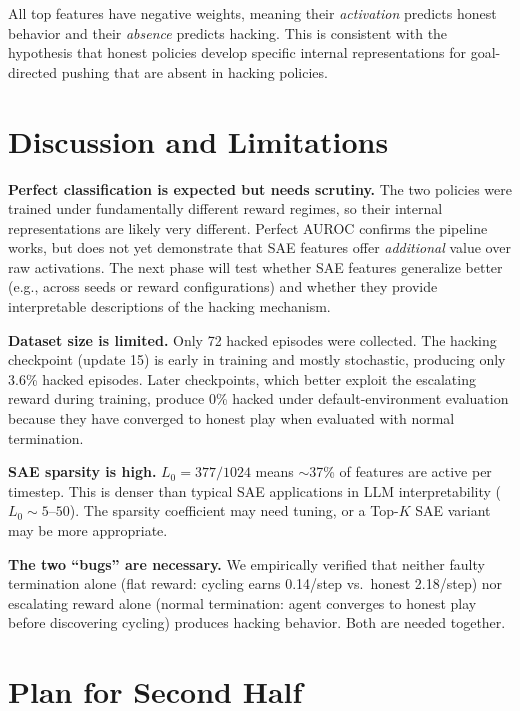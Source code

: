 \documentclass[11pt]{article}
\begin{document}
All top features have negative weights, meaning their \emph{activation} predicts honest behavior and their \emph{absence} predicts hacking.  This is consistent with the hypothesis that honest policies develop specific internal representations for goal-directed pushing that are absent in hacking policies.

\section{Discussion and Limitations}

\textbf{Perfect classification is expected but needs scrutiny.}  The two policies were trained under fundamentally different reward regimes, so their internal representations are likely very different.  Perfect AUROC confirms the pipeline works, but does not yet demonstrate that SAE features offer \emph{additional} value over raw activations.  The next phase will test whether SAE features generalize better (e.g., across seeds or reward configurations) and whether they provide interpretable descriptions of the hacking mechanism.

\textbf{Dataset size is limited.}  Only 72 hacked episodes were collected.  The hacking checkpoint (update 15) is early in training and mostly stochastic, producing only 3.6\% hacked episodes.  Later checkpoints, which better exploit the escalating reward during training, produce 0\% hacked under default-environment evaluation because they have converged to honest play when evaluated with normal termination.

\textbf{SAE sparsity is high.}  $L_0 = 377/1024$ means $\sim$37\% of features are active per timestep.  This is denser than typical SAE applications in LLM interpretability ($L_0 \sim 5$--$50$).  The sparsity coefficient may need tuning, or a Top-$K$ SAE variant may be more appropriate.

\textbf{The two ``bugs'' are necessary.}  We empirically verified that neither faulty termination alone (flat reward: cycling earns 0.14/step vs.\ honest 2.18/step) nor escalating reward alone (normal termination: agent converges to honest play before discovering cycling) produces hacking behavior.  Both are needed together.

\section{Plan for Second Half}
\end{document}
